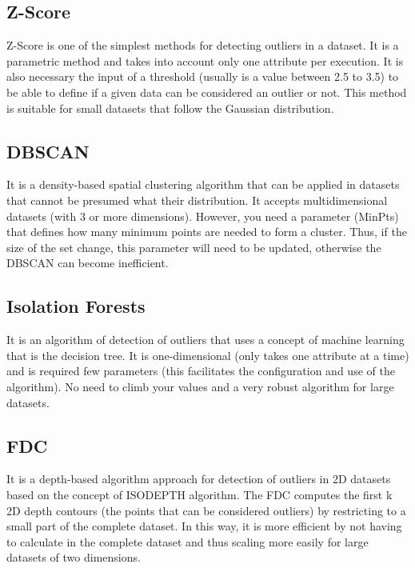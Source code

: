\subsection{Z-Score}

Z-Score is one of the simplest methods for detecting outliers in a dataset. It is a
parametric method and takes into account only one attribute per execution. It is also
necessary the input of a threshold (usually is a value between 2.5 to 3.5) to be able
to define if a given data can be considered an outlier or not. This method is suitable
for small datasets that follow the Gaussian distribution.

\subsection{DBSCAN}

It is a density-based spatial clustering algorithm \cite{Ester:1996:DAD:3001460.3001507} that can be applied in datasets that cannot be presumed what their distribution. It accepts multidimensional datasets (with 3 or more dimensions). However, you need a parameter (MinPts) that defines how many minimum points are needed to form a cluster. Thus, if the size of the set change, this parameter will need to be updated, otherwise the DBSCAN can become inefficient.

\subsection{Isolation Forests}

It is an algorithm of detection of outliers \cite{IsolationForests} that uses a concept of machine learning that
is the decision tree. It is one-dimensional (only takes one attribute at a time) and is
required few parameters (this facilitates the configuration and use of the algorithm).
No need to climb your values and a very robust algorithm for large datasets.



\subsection{FDC}

It is a depth-based algorithm \cite{Johnson:1998:FCD:3000292.3000332} approach for detection of outliers in 2D datasets based on the concept of ISODEPTH algorithm. The FDC computes the first k 2D depth contours (the points that can be considered outliers) by restricting to a small part of the complete dataset. In this way, it is more efficient by not having to calculate in the complete dataset and thus scaling more easily for large datasets of two dimensions.

